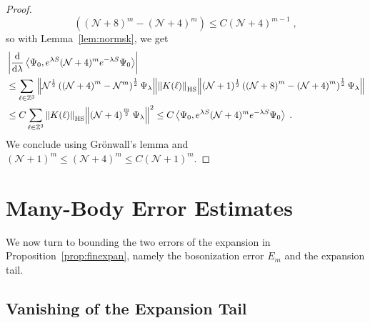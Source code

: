 \documentclass[12pt,a4paper]{article}
\numberwithin{equation}{section}
\newcommand{\cN}{\mathcal{N}}
\newcommand{\1}{\mathbb{I}}
\newcommand{\di}{\textnormal{d}}
\newcommand{\HS}{\mathrm{HS}}
\newcommand{\Zstar}{\mathbb{Z}^3} %
\newcommand{\Z}{\mathbb{Z}}
\newcommand{\NN}{\mathcal{N}}
\newcommand{\half}{\frac{1}{2}}
\newcommand{\eva}[1]{\left\langle #1 \right\rangle}
\theoremstyle{plain}
\theoremstyle{definition}
\theoremstyle{remark}
\theoremstyle{plain}
\theoremstyle{definition}
\theoremstyle{remark}
\begin{document}
\begin{proof}
\begin{equation}
	\left( \left(\NN+8\right)^m - \left(\NN+4\right)^m \right)
	\leq C \left(\NN+4\right)^{m-1} \;,
\end{equation}
so with Lemma~\ref{lem:normsk}, we get
\begin{align}
	&\left|\frac{\di}{\di\lambda}\eva{\Psi_0, e^{\lambda S} (\mathcal{N}+4)^m e^{-\lambda S} \Psi_0 }\right| \nonumber\\
	&\leq \sum_{\ell\in \Zstar}
		\norm{ \NN^\half \left( \left(\NN+4\right)^m - \NN^m \right)^\half \Psi_\lambda}
		\norm{K(\ell)}_{\HS}
		\norm{ (\NN+1)^\half \left( \left(\NN+8\right)^m - \left(\NN+4\right)^m \right)^\half \Psi_\lambda } \nonumber\\
	&\leq C \sum_{\ell\in \Zstar}
		\norm{K(\ell)}_{\HS}
		\norm{ \left(\NN+4\right)^\frac{m}{2} \Psi_\lambda}^2
	\leq C \eva{\Psi_0, e^{\lambda S} (\mathcal{N}+4)^m e^{-\lambda S} \Psi_0 } \;.
\end{align}
We conclude using Gr\"onwall's lemma and $ (\cN+1)^m \le (\cN+4)^m \le C (\cN+1)^m $.
\end{proof}

\section{Many-Body Error Estimates}
\label{subsec:manybody_estimates}

We now turn to bounding the two errors of the expansion in Proposition~\ref{prop:finexpan}, namely the bosonization error $ E_m $ and the expansion tail.


\subsection{Vanishing of the Expansion Tail}
\label{subsec:tailestimate}
\end{document}
